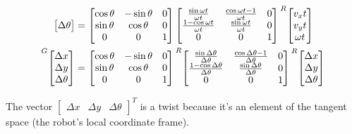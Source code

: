 \begin{align}
{\begin{bmatrix}
    \Delta \theta
  \end{bmatrix}} &=
  \begin{bmatrix}
    \cos\theta & -\sin\theta & 0 \\
    \sin\theta &  \cos\theta & 0 \\
             0 &           0 & 1
  \end{bmatrix}
  \begin{bmatrix}
    \frac{\sin\omega t}{\omega t} & \frac{\cos\omega t - 1}{\omega t} & 0 \\
    \frac{1 - \cos\omega t}{\omega t} & \frac{\sin\omega t}{\omega t} & 0 \\
    0 & 0 & 1
  \end{bmatrix}
  \prescript{R}{}{\begin{bmatrix}
    v_x t \\
    v_y t \\
    \omega t
  \end{bmatrix}} \nonumber \\
  \prescript{G}{}{\begin{bmatrix}
    \Delta x \\
    \Delta y \\
    \Delta \theta
  \end{bmatrix}} &=
  \begin{bmatrix}
    \cos\theta & -\sin\theta & 0 \\
    \sin\theta &  \cos\theta & 0 \\
             0 &           0 & 1
  \end{bmatrix}
  \prescript{R}{}{\begin{bmatrix}
    \frac{\sin\Delta\theta}{\Delta\theta} &
      \frac{\cos\Delta\theta - 1}{\Delta\theta} & 0 \\
    \frac{1 - \cos\Delta\theta}{\Delta\theta} &
      \frac{\sin\Delta\theta}{\Delta\theta} & 0 \\
    0 & 0 & 1
  \end{bmatrix}}
  \prescript{R}{}{\begin{bmatrix}
    \Delta x \\
    \Delta y \\
    \Delta\theta
  \end{bmatrix}}
  \label{eq:se2_exp_twist}
\end{align}

The vector $\begin{bmatrix}\Delta x & \Delta y & \Delta\theta \end{bmatrix}^T$
is a twist because it's an element of the tangent space (the robot's local
coordinate frame).

